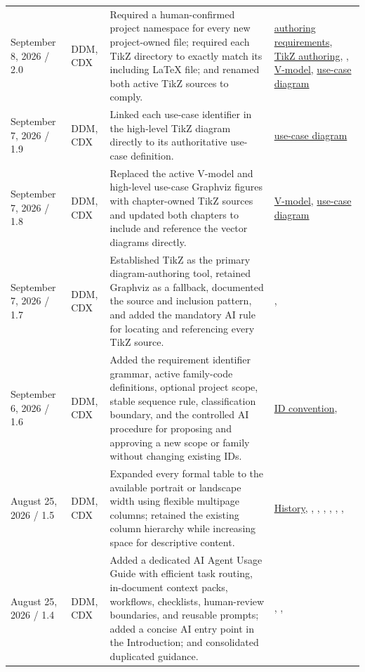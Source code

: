 \begin{tabularx}{\linewidth}{L{3.1cm}L{2.2cm}YL{2.0cm}}
September 8, 2026 / 2.0 & DDM, CDX & Required a human-confirmed project namespace for every new project-owned file; required each TikZ directory to exactly match its including LaTeX file; and renamed both active TikZ sources to comply. & \hyperref[Table:DocumentAuthoringRequirements]{authoring requirements}, \hyperref[Section:TikZAuthoring]{TikZ authoring}, , \hyperref[Figure:VModel]{V-model}, \hyperref[Figure:UseCaseDiagram]{use-case diagram}\\
September 7, 2026 / 1.9 & DDM, CDX & Linked each use-case identifier in the high-level TikZ diagram directly to its authoritative use-case definition. & \hyperref[Figure:UseCaseDiagram]{use-case diagram}\\
September 7, 2026 / 1.8 & DDM, CDX & Replaced the active V-model and high-level use-case Graphviz figures with chapter-owned TikZ sources and updated both chapters to include and reference the vector diagrams directly. & \hyperref[Figure:VModel]{V-model}, \hyperref[Figure:UseCaseDiagram]{use-case diagram}\\
September 7, 2026 / 1.7 & DDM, CDX & Established TikZ as the primary diagram-authoring tool, retained Graphviz as a fallback, documented the source and inclusion pattern, and added the mandatory AI rule for locating and referencing every TikZ source. & , \\
September 6, 2026 / 1.6 & DDM, CDX & Added the requirement identifier grammar, active family-code definitions, optional project scope, stable sequence rule, classification boundary, and the controlled AI procedure for proposing and approving a new scope or family without changing existing IDs. & \hyperref[Table:RequirementIdentifierConvention]{ID convention}, \\
August 25, 2026 / 1.5 & DDM, CDX & Expanded every formal table to the available portrait or landscape width using flexible multipage columns; retained the existing column hierarchy while increasing space for descriptive content. & \hyperref[Table:DocumentHistory]{History}, , , , , , , \\
August 25, 2026 / 1.4 & DDM, CDX & Added a dedicated AI Agent Usage Guide with efficient task routing, in-document context packs, workflows, checklists, human-review boundaries, and reusable prompts; added a concise AI entry point in the Introduction; and consolidated duplicated guidance. & , , \\

\end{tabularx}
